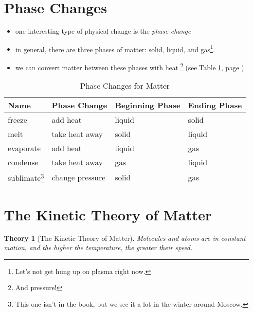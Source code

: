 \documentclass[11pt, oneside]{article}   	%
\newtheorem{theory}{Theory}
\begin{document}
\section{Phase Changes}
\begin{itemize}
\item one interesting type of physical change is the \emph{phase change}
\item in general, there are three phases of matter: solid, liquid, and gas\footnote{Let's not get hung up on plasma right now.}.
\item we can convert matter between these phases with heat \footnote{And pressure!} (see Table \ref{table:phase-changes}, page \pageref{table:phase-changes})
\end{itemize}

\begin{table}[h]
\centering
\begin{tabular}[b]{| l | l | l | l |}
\textbf{Name} & \textbf{Phase Change} & \textbf{Beginning Phase} & \textbf{Ending Phase} \\
\hline
freeze & add heat & liquid & solid \\
melt & take heat away & solid & liquid \\
evaporate & add heat & liquid & gas \\
condense & take heat away & gas & liquid \\
sublimate\footnote{This one isn't in the book, but we see it a lot in the winter around Moscow.} & change pressure & solid & gas \\
\end{tabular}
\caption{Phase Changes for Matter}
\label{table:phase-changes}
\end{table}

\section{The Kinetic Theory of Matter}
\begin{theory}[The Kinetic Theory of Matter]\label{theory:kinetic-theory-matter}
Molecules and atoms are in constant motion, and the higher the temperature, the greater their speed.
\end{theory}
\end{document}
